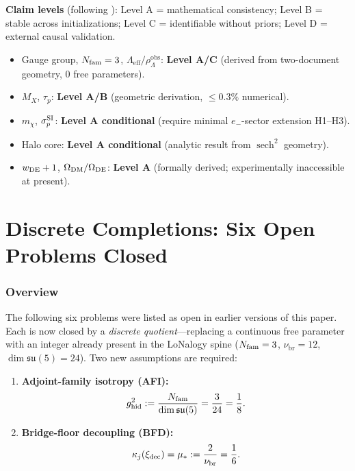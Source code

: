 \documentclass[12pt]{article}
\theoremstyle{plain}
\theoremstyle{definition}
\numberwithin{equation}{section}
\newcommand{\br}{\mathrm{br}}
\newcommand{\eff}{\mathrm{eff}}
\newcommand{\obs}{\mathrm{obs}}
\DeclareMathOperator{\sech}{sech}
\begin{document}
\medskip

\noindent\textbf{Claim levels} (following \cite{YMmassGap}):
Level A = mathematical consistency; Level B = stable across
initializations; Level C = identifiable without priors;
Level D = external causal validation.

\begin{itemize}
\item Gauge group, $N_{\rm fam}=3$, $\Lambda_\eff/\rho_\Lambda^{\obs}$:
  \textbf{Level A/C} (derived from two-document geometry, 0 free parameters).
\item $M_X$, $\tau_p$: \textbf{Level A/B} (geometric derivation, $\leq0.3\%$ numerical).
\item $m_\chi$, $\sigma_p^{\rm SI}$: \textbf{Level A conditional}
  (require minimal $e_-$-sector extension H1--H3).
\item Halo core: \textbf{Level A conditional} (analytic result from $\sech^2$ geometry).
\item $w_{\rm DE}+1$, $\Omega_{\rm DM}/\Omega_{\rm DE}$: \textbf{Level A}
  (formally derived; experimentally inaccessible at present).
\end{itemize}

\part{Discrete Completions: Six Open Problems Closed}

\section{Overview}\label{sec:discrete}

The following six problems were listed as open in earlier versions of this paper.  Each is now closed by a \emph{discrete quotient}---replacing a continuous free parameter with an integer already present in the LoNalogy spine ($N_{\rm fam}=3$, $\nu_\br=12$, $\dim\mathfrak{su}(5)=24$).  Two new assumptions are required:

\begin{enumerate}
\item \textbf{Adjoint-family isotropy (AFI):}
\[
g_{\rm hid}^2 := \frac{N_{\rm fam}}{\dim\mathfrak{su}(5)} = \frac{3}{24} = \frac{1}{8}.
\]
\item \textbf{Bridge-floor decoupling (BFD):}
\[
\kappa_j(\xi_{\rm dec}) = \mu_* := \frac{2}{\nu_\br} = \frac{1}{6}.
\]
\end{enumerate}
\end{document}
